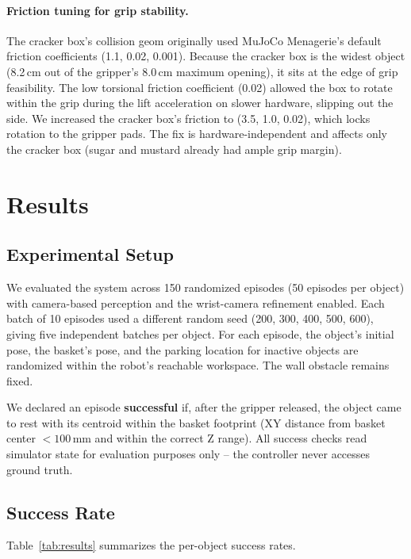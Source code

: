 \documentclass[11pt]{article}
\begin{document}
\paragraph{Friction tuning for grip stability.}
The cracker box's collision geom originally used MuJoCo Menagerie's
default friction coefficients (1.1, 0.02, 0.001). Because the cracker
box is the widest object (8.2\,cm out of the gripper's 8.0\,cm maximum
opening), it sits at the edge of grip feasibility. The low torsional
friction coefficient (0.02) allowed the box to rotate within the grip
during the lift acceleration on slower hardware, slipping out the side.
We increased the cracker box's friction to (3.5, 1.0, 0.02), which
locks rotation to the gripper pads. The fix is hardware-independent
and affects only the cracker box (sugar and mustard already had ample
grip margin).

\section{Results}

\subsection{Experimental Setup}

We evaluated the system across 150 randomized episodes (50 episodes per
object) with camera-based perception and the wrist-camera refinement
enabled. Each batch of 10 episodes used a different random seed
(200, 300, 400, 500, 600), giving five independent batches per object.
For each episode, the object's initial pose, the basket's pose, and the
parking location for inactive objects are randomized within the robot's
reachable workspace. The wall obstacle remains fixed.

We declared an episode \textbf{successful} if, after the gripper
released, the object came to rest with its centroid within the basket
footprint (XY distance from basket center $< 100$\,mm and within the
correct Z range). All success checks read simulator state for evaluation
purposes only -- the controller never accesses ground truth.

\subsection{Success Rate}

Table~\ref{tab:results} summarizes the per-object success rates.
\end{document}
